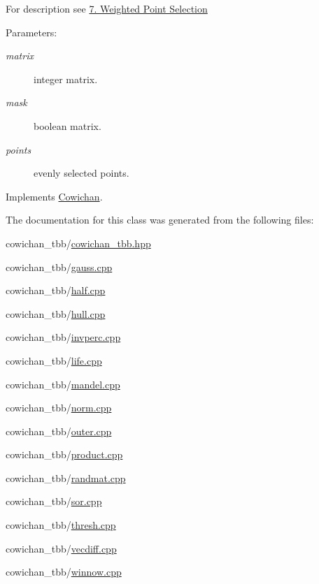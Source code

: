 For description see \hyperlink{index_winnow_sec}{7. Weighted Point Selection} \begin{Desc}
\item[Parameters:]
\begin{description}
\item[{\em matrix}]integer matrix. \item[{\em mask}]boolean matrix. \item[{\em points}]evenly selected points. \end{description}
\end{Desc}


Implements \hyperlink{class_cowichan_13d60e06ced3b5da79d62c133ce82337}{Cowichan}.

The documentation for this class was generated from the following files:\begin{CompactItemize}
\item 
cowichan\_\-tbb/\hyperlink{cowichan__tbb_8hpp}{cowichan\_\-tbb.hpp}\item 
cowichan\_\-tbb/\hyperlink{cowichan__tbb_2gauss_8cpp}{gauss.cpp}\item 
cowichan\_\-tbb/\hyperlink{cowichan__tbb_2half_8cpp}{half.cpp}\item 
cowichan\_\-tbb/\hyperlink{cowichan__tbb_2hull_8cpp}{hull.cpp}\item 
cowichan\_\-tbb/\hyperlink{cowichan__tbb_2invperc_8cpp}{invperc.cpp}\item 
cowichan\_\-tbb/\hyperlink{cowichan__tbb_2life_8cpp}{life.cpp}\item 
cowichan\_\-tbb/\hyperlink{cowichan__tbb_2mandel_8cpp}{mandel.cpp}\item 
cowichan\_\-tbb/\hyperlink{cowichan__tbb_2norm_8cpp}{norm.cpp}\item 
cowichan\_\-tbb/\hyperlink{cowichan__tbb_2outer_8cpp}{outer.cpp}\item 
cowichan\_\-tbb/\hyperlink{cowichan__tbb_2product_8cpp}{product.cpp}\item 
cowichan\_\-tbb/\hyperlink{cowichan__tbb_2randmat_8cpp}{randmat.cpp}\item 
cowichan\_\-tbb/\hyperlink{cowichan__tbb_2sor_8cpp}{sor.cpp}\item 
cowichan\_\-tbb/\hyperlink{cowichan__tbb_2thresh_8cpp}{thresh.cpp}\item 
cowichan\_\-tbb/\hyperlink{cowichan__tbb_2vecdiff_8cpp}{vecdiff.cpp}\item 
cowichan\_\-tbb/\hyperlink{cowichan__tbb_2winnow_8cpp}{winnow.cpp}\end{CompactItemize}
